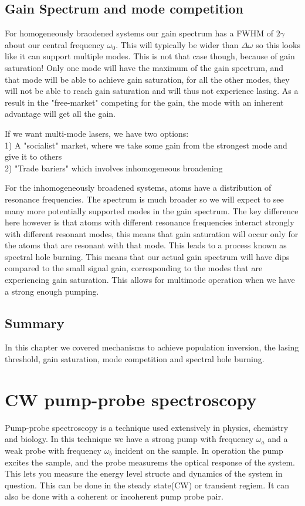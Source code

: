 \subsection{Gain Spectrum and mode competition}
For homogeneously braodened systems our gain spectrum has a FWHM of $2\gamma$ about our central frequency $\omega_0$. This will typically be wider than $\Delta\omega$ so this looks like it can support multiple modes.
This is not that case though, because of gain saturation! 
Only one mode  will have the maximum of the gain spectrum, and that mode will be able to achieve gain saturation, for all the other modes, they will not be able to reach gain saturation and will thus not experience lasing.
As a result in the "free-market" competing for the gain, the mode with an inherent advantage will get all the gain.

If we want multi-mode lasers, we have two options:\\
1) A "socialist" market, where we take some gain from the strongest mode and give it to others\\
2) "Trade bariers" which involves inhomogeneous broadening

For the inhomogeneously broadened systems, atoms have a distribution of resonance frequencies. The spectrum is much broader so we will expect to see many more potentially supported modes in the gain spectrum.
The key difference here however is that atoms with different resonance frequencies interact strongly with different resonant modes, this means that gain saturation will occur only for the atoms that are resonant with that mode.
This leads to a process known as spectral hole burning. This means that our actual gain spectrum will have dips compared to the small signal gain, corresponding to the modes that are experiencing gain saturation.
This allows for multimode operation when we have a strong enough pumping.
\subsection{Summary}
In this chapter we covered mechanisms to achieve population inversion, the lasing threshold, gain saturation, mode competition and spectral hole burning.
\section{CW pump-probe spectroscopy}
Pump-probe spectroscopy is a technique used extensively in physics, chemistry and biology. In this technique we have a strong pump with frequency $\omega_a$ and a weak probe with frequency $\omega_b$ incident on the sample.
In operation the pump excites the sample, and the probe measurems the optical response of the system. This lets you measure the energy level structe and dynamics of the system in question.
This can be done in the steady state(CW) or transient regiem. It can also be done with a coherent or incoherent pump probe pair.

